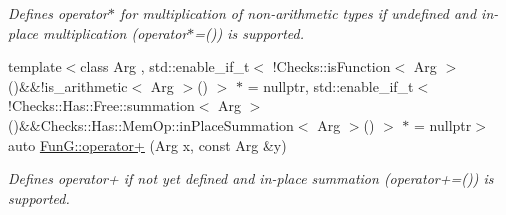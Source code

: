 \begin{DoxyCompactItemize}
\begin{DoxyCompactList}\small\item\em \-Defines operator$\ast$ for multiplication of non-\/arithmetic types if undefined and in-\/place multiplication (operator$\ast$=()) is supported. \end{DoxyCompactList}\item 
{\footnotesize template$<$class Arg , std\-::enable\-\_\-if\-\_\-t$<$ !\-Checks\-::is\-Function$<$ Arg $>$()\&\&!is\-\_\-arithmetic$<$ Arg $>$() $>$ $\ast$  = nullptr, std\-::enable\-\_\-if\-\_\-t$<$ !\-Checks\-::\-Has\-::\-Free\-::summation$<$ Arg $>$()\&\&\-Checks\-::\-Has\-::\-Mem\-Op\-::in\-Place\-Summation$<$ Arg $>$() $>$ $\ast$  = nullptr$>$ }\\auto \hyperlink{namespaceFunG_a063d3e8c19dbea3ee1396736fecb64e1}{\-Fun\-G\-::operator+} (\-Arg x, const \-Arg \&y)
\begin{DoxyCompactList}\small\item\em \-Defines operator+ if not yet defined and in-\/place summation (operator+=()) is supported. \end{DoxyCompactList}\end{DoxyCompactItemize}
